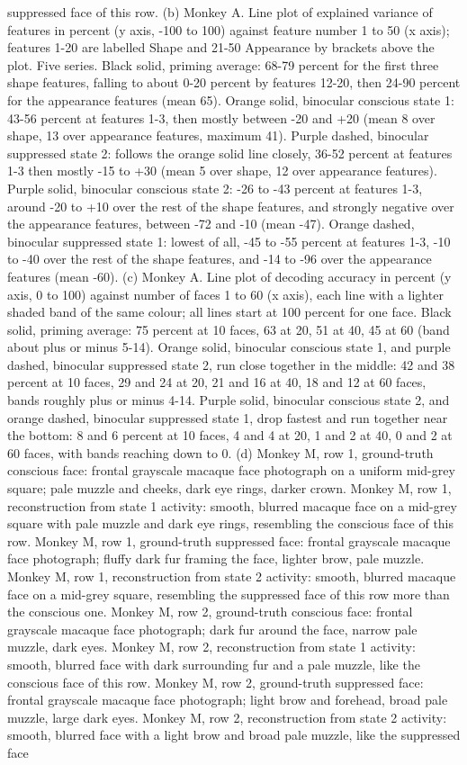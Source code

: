 \documentclass{article}
\begin{document}
suppressed face of this row. (b) Monkey A. Line plot of explained variance of features in percent (y axis, -100 to 100) against feature number 1 to 50 (x axis); features 1-20 are labelled Shape and 21-50 Appearance by brackets above the plot. Five series. Black solid, priming average: 68-79 percent for the first three shape features, falling to about 0-20 percent by features 12-20, then 24-90 percent for the appearance features (mean 65). Orange solid, binocular conscious state 1: 43-56 percent at features 1-3, then mostly between -20 and +20 (mean 8 over shape, 13 over appearance features, maximum 41). Purple dashed, binocular suppressed state 2: follows the orange solid line closely, 36-52 percent at features 1-3 then mostly -15 to +30 (mean 5 over shape, 12 over appearance features). Purple solid, binocular conscious state 2: -26 to -43 percent at features 1-3, around -20 to +10 over the rest of the shape features, and strongly negative over the appearance features, between -72 and -10 (mean -47). Orange dashed, binocular suppressed state 1: lowest of all, -45 to -55 percent at features 1-3, -10 to -40 over the rest of the shape features, and -14 to -96 over the appearance features (mean -60). (c) Monkey A. Line plot of decoding accuracy in percent (y axis, 0 to 100) against number of faces 1 to 60 (x axis), each line with a lighter shaded band of the same colour; all lines start at 100 percent for one face. Black solid, priming average: 75 percent at 10 faces, 63 at 20, 51 at 40, 45 at 60 (band about plus or minus 5-14). Orange solid, binocular conscious state 1, and purple dashed, binocular suppressed state 2, run close together in the middle: 42 and 38 percent at 10 faces, 29 and 24 at 20, 21 and 16 at 40, 18 and 12 at 60 faces, bands roughly plus or minus 4-14. Purple solid, binocular conscious state 2, and orange dashed, binocular suppressed state 1, drop fastest and run together near the bottom: 8 and 6 percent at 10 faces, 4 and 4 at 20, 1 and 2 at 40, 0 and 2 at 60 faces, with bands reaching down to 0. (d) Monkey M, row 1, ground-truth conscious face: frontal grayscale macaque face photograph on a uniform mid-grey square; pale muzzle and cheeks, dark eye rings, darker crown. Monkey M, row 1, reconstruction from state 1 activity: smooth, blurred macaque face on a mid-grey square with pale muzzle and dark eye rings, resembling the conscious face of this row. Monkey M, row 1, ground-truth suppressed face: frontal grayscale macaque face photograph; fluffy dark fur framing the face, lighter brow, pale muzzle. Monkey M, row 1, reconstruction from state 2 activity: smooth, blurred macaque face on a mid-grey square, resembling the suppressed face of this row more than the conscious one. Monkey M, row 2, ground-truth conscious face: frontal grayscale macaque face photograph; dark fur around the face, narrow pale muzzle, dark eyes. Monkey M, row 2, reconstruction from state 1 activity: smooth, blurred face with dark surrounding fur and a pale muzzle, like the conscious face of this row. Monkey M, row 2, ground-truth suppressed face: frontal grayscale macaque face photograph; light brow and forehead, broad pale muzzle, large dark eyes. Monkey M, row 2, reconstruction from state 2 activity: smooth, blurred face with a light brow and broad pale muzzle, like the suppressed face 
\end{document}
